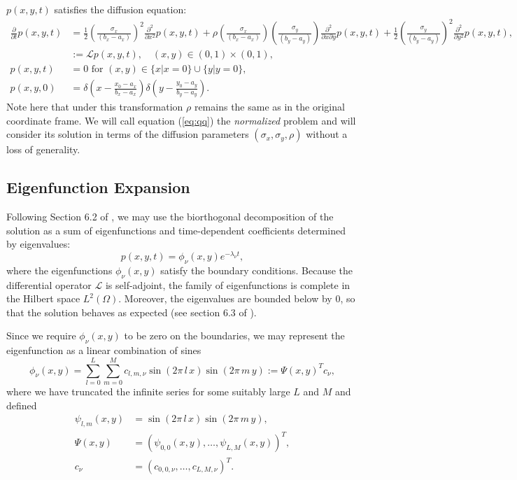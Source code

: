 \documentclass[10pt]{article}
\begin{document}
$p(x,y,t)$ satisfies the diffusion
equation:
\begin{align}
  \frac{\partial}{\partial t} p(x,y,t) &= \frac{1}{2}\left( \frac{\sigma_x}{(b_x-a_x)} \right)^2
                                                    \frac{\partial^2}{\partial x^2}p(x,y,t) + \rho\left( \frac{\sigma_x}{(b_x-a_x)} \right)\left( \frac{\sigma_y}{(b_y-a_y)} \right)
                                                    \frac{\partial^2}{\partial x \partial y}p(x,y,t) +
                                         \frac{1}{2}\left( \frac{\sigma_y}{(b_y-a_y)} \right)^2 \frac{\partial^2}{\partial y^2}p(x,y,t) , \label{eq:qq} \\
  &:= \mathcal{L}p(x,y,t),\quad (x,y) \in (0,1) \times (0,1), \\
  p(x,y,t) &=0 \mbox{ for }  (x,y) \in \{ x | x = 0\} \cup \{ y | y = 0\}, \nonumber \\
  p(x,y,0) &= \delta\left( x - \frac{x_0-a_x}{b_x - a_x} \right) \delta\left(y-\frac{y_0 - a_y}{b_y - a_y}\right). \nonumber
\end{align}
Note here that under this transformation $\rho$ remains the same as in
the original coordinate frame. We will call equation (\ref{eq:qq}) the
\textit{normalized} problem and will consider its solution in terms of
the diffusion parameters $(\sigma_x, \sigma_y, \rho)$ without a loss
of generality.

\subsection{Eigenfunction Expansion} \label{sec:eigenfunction}
Following Section 6.2 of \cite{risken1989fokker-planck}, we may use
the biorthogonal decomposition of the solution as a sum of
eigenfunctions and time-dependent coefficients determined by eigenvalues:
\begin{equation}
  p(x,y,t) = \phi_\nu(x,y) e^{-\lambda_\nu t}, \label{eq:biorthogonal}
\end{equation}
where the eigenfunctions $\phi_\nu(x, y)$ satisfy the boundary
conditions. Because the differential operator $\mathcal{L}$ is
self-adjoint, the family of eigenfunctions is complete in the Hilbert
space $L^2(\Omega)$. Moreover, the eigenvalues are bounded below by 0,
so that the solution behaves as expected (see section 6.3 of
\cite{risken1989fokker-planck}).

Since we require $\phi_\nu(x,y)$ to be zero on the boundaries, we
may represent the eigenfunction as a linear combination of sines
\[
  \phi_\nu(x,y) = \sum_{l=0}^L \sum_{m=0}^M c_{l,m, \nu}
  \sin\left(2\pi\, l\, x \right) \sin\left(2\pi\, m\, y \right) := \Psi(x,y)^T c_\nu,
\]
where we have truncated the infinite series for some suitably large
$L$ and $M$ and defined
\begin{align*}
  \psi_{l,m}(x,y) &= \sin\left(2\pi\, l\, x \right)
                         \sin\left(2\pi\, m\, y \right), \\
  \Psi(x,y) &= (\psi_{0,0}(x,y), \ldots, \psi_{L,M}(x,y))^T, \\
  c_\nu &= (c_{0,0,\nu}, \ldots, c_{L,M,\nu})^T.
\end{align*}
\end{document}
